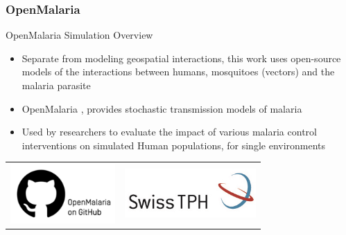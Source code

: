 \documentclass{beamer}
\begin{document}
\subsubsection{OpenMalaria}

\begin{frame}{OpenMalaria Simulation Overview}


\begin{itemize}
\item Separate from modeling geospatial interactions, this work uses open-source models of the interactions between humans, mosquitoes (vectors) and the malaria parasite
\item OpenMalaria \cite{SMITH2008a}, provides stochastic transmission models of malaria 
\item Used by researchers to evaluate the impact of various malaria control interventions on simulated Human populations, for single environments

\end{itemize}

\centering
 \begin{tabular}{cc}
        
        \includegraphics[width=4cm]{images/GH.png}
        &
         \includegraphics[width=5cm]{images/swiss.jpg}
        
      \end{tabular}

\end{frame}

\end{document}
